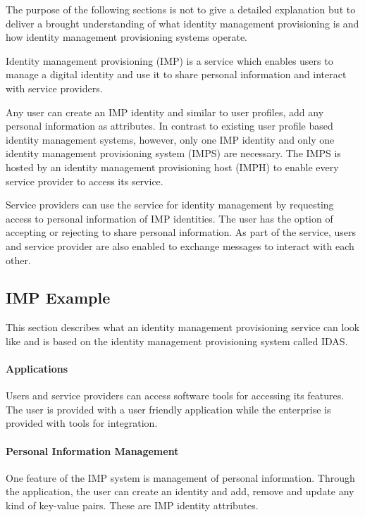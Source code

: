 The purpose of the following sections is not to give a detailed explanation but to deliver a brought understanding of what identity management provisioning is and how identity management provisioning systems operate.

Identity management provisioning (IMP) is a service which enables users to manage a digital identity and use it to share personal information and interact with service providers.

Any user can create an IMP identity and similar to user profiles, add any personal information as attributes. In contrast to existing user profile based identity management systems, however, only one IMP identity and only one identity management provisioning system (IMPS) are necessary. The IMPS is hosted by an identity management provisioning host (IMPH) to enable every service provider to access its service.

Service providers can use the service for identity management by requesting access to personal information of IMP identities. The user has the option of accepting or rejecting to share personal information. As part of the service, users and service provider are also enabled to exchange messages to interact with each other.

\subsection{IMP Example}

This section describes what an identity management provisioning service can look like and is based on the identity management provisioning system called IDAS.

\paragraph{Applications} Users and service providers can access  software tools for accessing its features. The user is provided with a user friendly application while the enterprise is provided with tools for integration.

\paragraph{Personal Information Management} One feature of the IMP system is management of personal information. Through the application, the user can create an identity and add, remove and update any kind of key-value pairs. These are IMP identity attributes.

